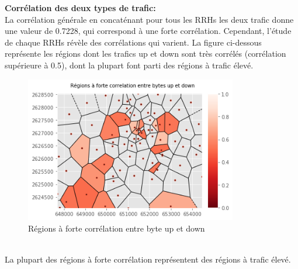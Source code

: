 \documentclass{report}
\begin{document}
\textbf{Corrélation des deux types de trafic: }\\
La corrélation générale en concaténant  pour tous les RRHs les deux trafic donne une valeur de 0.7228, qui correspond à une forte corrélation. Cependant, l'étude de chaque RRHs révèle des corrélations qui varient. La figure ci-dessous représente les régions dont les trafics up et down sont très corrélés (corrélation supérieure à 0.5), dont la plupart font parti des régions à trafic élevé.
\begin{figure}[H]
  \centering
  \includegraphics[width=25em]{images/correl.png}
  \caption{Régions à forte corrélation entre byte up et down }
\end{figure} \\

La plupart des régions à forte corrélation représentent des régions à trafic élevé.\\
\end{document}
